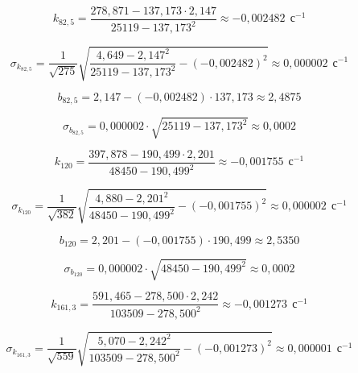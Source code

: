 \documentclass[a4paper,12pt]{article}
\begin{document}
\begin{equation*}
    k_{82,5} = \frac{278,871 - 137,173 \cdot 2,147}{25119 - {137,173}^2} \approx -0,002482 \ \ \text{с}^{-1}
\end{equation*}

\begin{equation*}
    \sigma_{k_{82,5}} = \frac{1}{\sqrt{275}} \sqrt{\frac{4,649 - {2,147}^2}{25119 - {137,173}^2} - (-0,002482)^2} \approx 0,000002 \ \ \text{с}^{-1}
\end{equation*}

\begin{equation*}
    b_{82,5} = 2,147 - (-0,002482) \cdot 137,173 \approx 2,4875
\end{equation*}

\begin{equation*}
    \sigma_{b_{82,5}} = 0,000002 \cdot \sqrt{25119 - {137,173}^2} \approx 0,0002
\end{equation*}

\begin{equation*}
    k_{120} = \frac{397,878 - 190,499 \cdot 2,201}{48450 - {190,499}^2} \approx -0,001755 \ \ \text{с}^{-1}
\end{equation*}

\begin{equation*}
    \sigma_{k_{120}} = \frac{1}{\sqrt{382}} \sqrt{\frac{4,880 - {2,201}^2}{48450 - {190,499}^2} - (-0,001755)^2} \approx 0,000002 \ \ \text{с}^{-1}
\end{equation*}

\begin{equation*}
    b_{120} = 2,201 - (-0,001755) \cdot 190,499 \approx 2,5350
\end{equation*}

\begin{equation*}
    \sigma_{b_{120}} = 0,000002 \cdot \sqrt{48450 - {190,499}^2} \approx 0,0002
\end{equation*}

\begin{equation*}
    k_{161,3} = \frac{591,465 - 278,500 \cdot 2,242}{103509 - {278,500}^2} \approx -0,001273 \ \ \text{с}^{-1}
\end{equation*}

\begin{equation*}
    \sigma_{k_{161,3}} = \frac{1}{\sqrt{559}} \sqrt{\frac{5,070 - {2,242}^2}{103509 - {278,500}^2} - (-0,001273)^2} \approx 0,000001 \ \ \text{с}^{-1}
\end{equation*}
\end{document}
